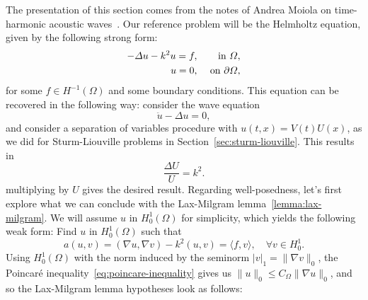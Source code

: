 The presentation of this section comes from the notes of Andrea Moiola on time-harmonic acoustic waves~\cite{moiola2021scattering}. Our reference problem will be the Helmholtz equation, given by the following strong form:
\begin{equation}
    \begin{aligned}
        -\Delta u -k^2 u = f, &&\text{ in } \Omega,\\
        u=0, &&\text{ on } \partial\Omega,
    \end{aligned}
\end{equation}
for some $f\in H^{-1}(\Omega)$ and some boundary conditions. This equation can be recovered in the following way: consider the wave equation
\begin{equation*}
    \ddot u - \Delta u = 0,
\end{equation*}
and consider a separation of variables procedure with $u(t,x) = V(t)U(x)$, as we did for Sturm-Liouville problems in Section~\ref{sec:sturm-liouville}. This results in 
\begin{equation*}
    \frac{\Delta U}{U} = k^2.
\end{equation*}
multiplying by $U$ gives the desired result. Regarding well-posedness, let's first explore what we can conclude with the Lax-Milgram lemma~\ref{lemma:lax-milgram}. We will assume $u$ in $H_0^1(\Omega)$ for simplicity, which yields the following weak form: Find $u$ in $H_0^1(\Omega)$ such that
\begin{equation}
    a(u,v) = (\nabla u, \nabla v) - k^2(u,v) = \langle f, v\rangle, \quad \forall v\in H_0^1.
\end{equation}
Using $H_0^1(\Omega)$ with the norm induced by the seminorm $|v|_1 = \|\nabla v\|_0$, the Poincaré inequality~\eqref{eq:poincare-inequality} gives us $\|u\|_0\leq C_{\Omega}\|\nabla u\|_0$, and so the Lax-Milgram lemma hypotheses look as follows: 

